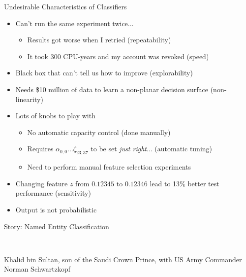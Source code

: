 \documentclass{beamer}
\begin{document}

\begin{frame}{Undesirable Characteristics of Classifiers}
\begin{itemize}
\item Can't run the same experiment twice...
  \begin{itemize}
    \item Results got worse when I retried (\alert{repeatability})
    \item It took 300 CPU-years and my account was revoked (\alert{speed})
  \end{itemize}
\item Black box that can't tell us how to improve (\alert{explorability})
\item Needs \$10 million of data to learn a non-planar decision surface (\alert{non-linearity})
\item Lots of knobs to play with
  \begin{itemize}
  \item No \alert{automatic capacity control} (done manually)
  \item Requires $\alpha_{0,0} ... \zeta_{23,37}$ to be set \emph{just right}... (\alert{automatic tuning})
  \item Need to perform manual \alert{feature selection} experiments
  \end{itemize}
\item Changing feature $z$ from $0.12345$ to $0.12346$ lead to 13\% better test performance (\alert{sensitivity})
\item Output is not \alert{probabilistic}
\end{itemize}
\end{frame}

\begin{frame}{Story: Named Entity Classification}

  \begin{center}
     \\
    \begin{tiny}{Khalid bin Sultan, son of the Saudi Crown Prince, with US Army Commander Norman Schwartzkopf}\end{tiny}
  \end{center}
  
\end{frame}
\end{document}

